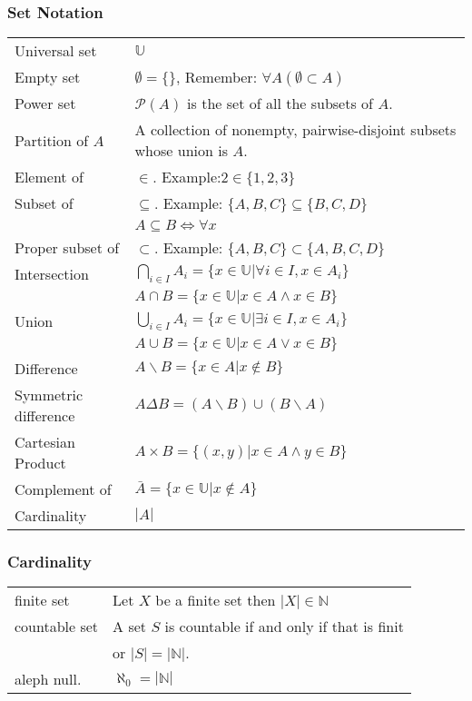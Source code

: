 \documentclass[5pt]{article}
\newcommand{\universalSet}{\mathbb{U}}
\begin{document}
\begin{multicols}{2}
\subsubsection{Set Notation}
\begin{tabular}{ll}
    Universal set           & $\universalSet$\\
    Empty set               & $\emptyset=\{\}$, Remember: $\forall A (\emptyset\subset A)$\\
    Power set               & $\mathcal{P}(A)$ is the set of all the subsets of $A$.\\
    Partition of $A$        & A collection of nonempty, pairwise-disjoint subsets whose union is $A$.\\
    Element of              & $\in$. Example:$2\in\{1,2,3\}$\\
    Subset of               & $\subseteq$. Example: $\{A, B,C\}\subseteq\{B,C,D\}$\\
                            & $A\subseteq B \Leftrightarrow\forall x$\\
    Proper subset of        & $\subset$. Example: $\{A, B,C\}\subset\{A, B,C,D\}$\\
    Intersection            & $\bigcap_{i\in I}A_i=\{x\in\universalSet|\forall i\in I, x\in A_i\}$\\
                            & $A\cap B=\{x\in\universalSet|x\in A\land x\in B\}$\\
    Union                   & $\bigcup_{i\in I}A_i=\{x\in\universalSet|\exists i\in I, x\in A_i\}$\\
                            & $A\cup B=\{x\in\universalSet|x\in A\lor x\in B\}$\\
    Difference              & $A\backslash B=\{x\in A|x\notin B\}$\\
    Symmetric difference    & $A\Delta B=(A\backslash B)\cup(B\backslash A)$\\
    Cartesian Product       & $A\times B=\{(x,y)|x\in A\land y \in B\}$\\
    Complement of           & $\bar{A}=\{x\in\universalSet|x\notin A\}$\\
    Cardinality             & $|A|$
    
\end{tabular}

\subsubsection{Cardinality}
\begin{tabular}{ll}
    finite set      & Let $X$ be a finite set then $|X|\in \mathbb{N}$\\
    countable set   & A set $S$ is countable if and only if that is finit\\
                    & or $|S|=|\mathbb{N}|$.\\
    aleph null.     & $\aleph_0=|\mathbb{N}|$\\
\end{tabular}


\end{multicols}
\end{document}
